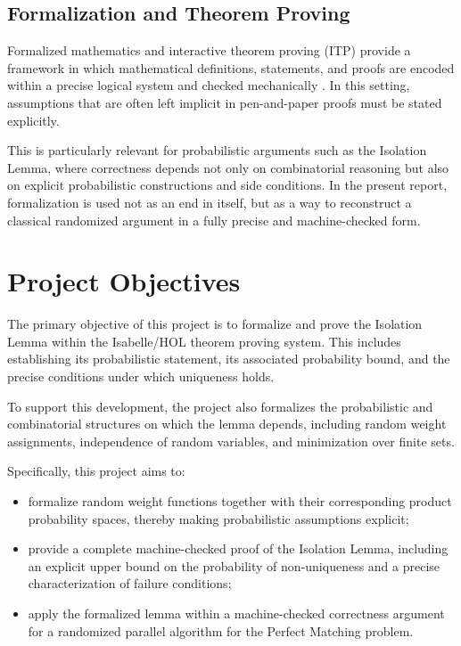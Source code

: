 \subsection{Formalization and Theorem Proving}

Formalized mathematics and interactive theorem proving (ITP) provide a framework in which mathematical definitions, statements, and proofs are encoded within a precise logical system and checked mechanically \cite{nipkow2002isabelle}.
In this setting, assumptions that are often left implicit in pen-and-paper proofs must be stated explicitly.

This is particularly relevant for probabilistic arguments such as the Isolation Lemma, where correctness depends not only on combinatorial reasoning but also on explicit probabilistic constructions and side conditions.
In the present report, formalization is used not as an end in itself, but as a way to reconstruct a classical randomized argument in a fully precise and machine-checked form.

\section{Project Objectives}
The primary objective of this project is to formalize and prove the Isolation Lemma within the Isabelle/HOL theorem proving system.
This includes establishing its probabilistic statement, its associated probability bound, and the precise conditions under which uniqueness holds.

To support this development, the project also formalizes the probabilistic and combinatorial structures on which the lemma depends, including random weight assignments, independence of random variables, and minimization over finite sets.

Specifically, this project aims to:
\begin{itemize}
    \item formalize random weight functions together with their corresponding product probability spaces, thereby making probabilistic assumptions explicit;
    \item provide a complete machine-checked proof of the Isolation Lemma, including an explicit upper bound on the probability of non-uniqueness and a precise characterization of failure conditions;
    \item apply the formalized lemma within a machine-checked correctness argument for a randomized parallel algorithm for the Perfect Matching problem.
\end{itemize}


